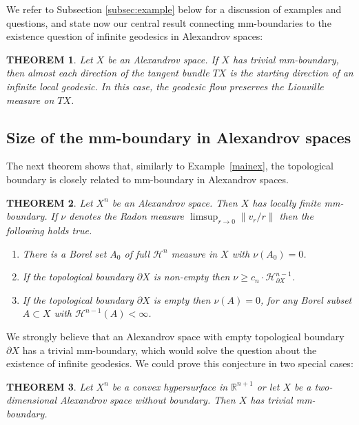 \documentclass[12pt,leqno]{amsart}
\numberwithin{equation}{section}
\newtheorem{thm}{THEOREM}[section]
\theoremstyle{definition}
\theoremstyle{remark}
\newcommand{\exref}[1]{Example~\ref{#1}}
\newcommand{\R}{\mathbb{R}}
\begin{document}
We refer to Subsection \ref{subsec:example}  below for a discussion of  examples and questions, and
 state now our central  result connecting  mm-boundaries to the existence question of infinite geodesics in Alexandrov spaces:

 \begin{thm} \label{thmmain}
 Let $X$ be an Alexandrov space. If $X$ has trivial mm-boundary, then  almost each direction of the tangent
 bundle $TX$ is the starting direction of  an infinite local geodesic. In this case, the geodesic flow preserves the Liouville measure on $TX$.
 \end{thm}

\subsection{Size of the mm-boundary in Alexandrov spaces}
The next theorem shows that, similarly to \exref{mainex},  the topological boundary is closely related to mm-boundary in Alexandrov spaces.

\begin{thm} \label{alexandrovthm}
Let $X^n$ be an Alexandrov space. Then $X$ has locally finite mm-boundary.
If $\nu$ denotes the Radon measure  $\limsup _{r\to 0} \|v_r /r\|$ then the following holds true.
\begin{enumerate}
\item\label{full-measure-zero-nu}There is a Borel set $A_0$ of full $\mathcal H^n$ measure in $X$
with $\nu (A_0)=0$.
\item\label{bry-nu} If the topological boundary $\partial X$ is non-empty then $\nu \geq c_n \cdot \mathcal H^{n-1} _{\partial X}$.
\item \label{n-1-nu} If the topological boundary $\partial X$ is empty then $\nu (A)=0$, for any Borel subset $A\subset X$ with  $\mathcal H^{n-1} (A)<\infty$.
\end{enumerate}
\end{thm}

 We strongly believe that an Alexandrov space with empty topological boundary $\partial X$  has a trivial mm-boundary,
which would solve the question about the existence of infinite geodesics.
We could prove this conjecture in two special cases:



\begin{thm} \label{hypersurface}
Let $X^n$ be a convex hypersurface in $\R^{n+1}$  or let $X$ be a two-dimensional  Alexandrov space without boundary. Then $X$ has trivial mm-boundary.
\end{thm}
\end{document}
